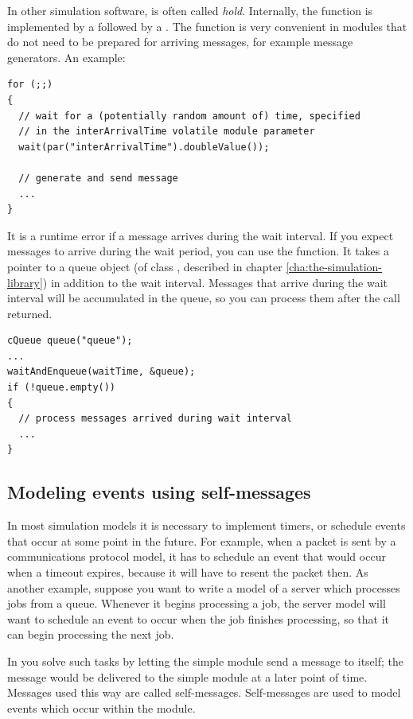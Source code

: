 In other simulation software,  is often called \textit{hold}.
Internally, the  function is implemented by a
 followed by a .
The  function is very convenient in modules that do not need
to be prepared for arriving messages, for example message generators.
An example:

\begin{verbatim}
for (;;)
{
  // wait for a (potentially random amount of) time, specified
  // in the interArrivalTime volatile module parameter
  wait(par("interArrivalTime").doubleValue());

  // generate and send message
  ...
}
\end{verbatim}

It is a runtime error if a message arrives during the wait interval.
If you expect messages to arrive during the wait period, you can
use the  function. It takes a pointer to a queue object
(of class , described in chapter \ref{cha:the-simulation-library})
in addition to the wait interval. Messages that arrive during the
wait interval will be accumulated in the queue, so you can
process them after the  call returned.

\begin{verbatim}
cQueue queue("queue");
...
waitAndEnqueue(waitTime, &queue);
if (!queue.empty())
{
  // process messages arrived during wait interval
  ...
}
\end{verbatim}


\subsection{Modeling events using self-messages}
\label{sec:ch-simple-modules:self-messages}

In most simulation models it is necessary to implement timers,
or schedule events that occur at some point in the future.
For example, when a packet is sent by a communications protocol model,
it has to schedule an event that would occur when a timeout expires,
because it will have to resent the packet then.
As another example, suppose you want to write a model of a server which
processes jobs from a queue. Whenever it begins processing
a job, the server model will want to schedule an event to occur
when the job finishes processing, so that it can begin processing
the next job.

In {\opp} you solve such tasks by letting the simple module
send a message to itself; the message would be delivered
to the simple module at a later point of time. Messages used
this way are called self-messages.
Self-messages are used to model events which occur within the module.

